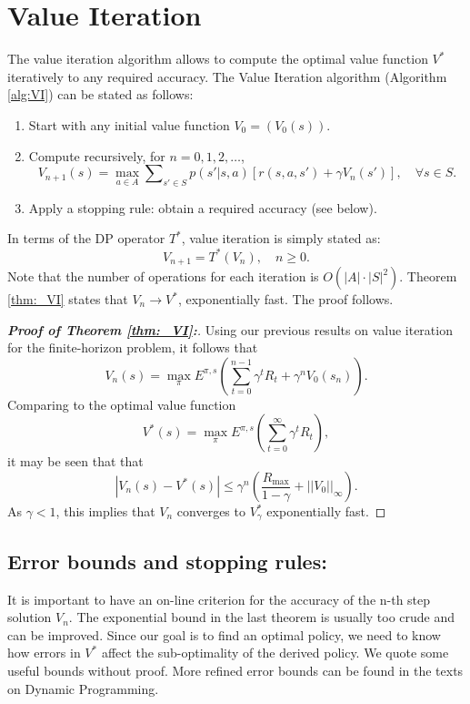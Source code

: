 \section{Value Iteration}

The value iteration algorithm allows to compute the optimal value function ${V^*}$ iteratively to any required accuracy.
The Value Iteration algorithm (Algorithm \ref{alg:VI}) can be stated as follows:
\begin{enumerate}
  \item Start with any initial value function ${V_0} = ({V_0}(s))$.
  \item Compute recursively, for $n = 0,1,2, \ldots $,
          \[{V_{n + 1}}(s) = \mathop {\max }\limits_{a \in A} \sum\nolimits_{s' \in S} {p(s'|s,a)[r(s,a,s') + \gamma {V_n}(s')]} ,       \quad \forall s \in S.\]
  \item Apply a stopping rule: obtain a required accuracy (see below).
\end{enumerate}
In terms of the DP operator $T_{}^*$, value iteration is simply stated as:
\[{V_{n + 1}} = T_{}^*({V_n}), \quad n \ge 0.\]
Note that the number of operations for each iteration is $O(|A| \cdot |S{|^2})$.
Theorem \ref{thm:_VI} states that ${V_n} \to V_{}^*$, exponentially fast. The proof follows.

\begin{proof}[\textbf{Proof of Theorem \ref{thm:_VI}:}]  Using our previous results on value iteration for the finite-horizon problem, it follows that
\[{V_n}(s) = \mathop {\max }\limits_\pi  {E^{\pi ,s}}(\sum\limits_{t = 0}^{n - 1} {{\gamma ^t}{R_t} + } {\gamma ^n}{V_0}({s_n})).\]
Comparing to the optimal value function
\[{V^*}(s) = \mathop {\max }\limits_\pi  {E^{\pi ,s}}(\sum\limits_{t = 0}^\infty  {{\gamma ^t}{R_t}} ),\]
it may be seen that that
                                \[|{V_n}(s) - V_{}^*(s)| \le {\gamma ^n}(\frac{{{R_{\max }}}}{{1 - \gamma }} + ||{V_0}|{|_\infty }).\]
As $\gamma  < 1$, this implies that ${V_n}$ converges to $V_\gamma ^*$  exponentially fast.                        \end{proof}


\subsection{Error bounds and stopping rules:}
It is important to have an on-line criterion for the accuracy of the n-th step solution ${V_n}$. The exponential bound in the last theorem is usually too crude and can be improved. Since our goal is to find an optimal policy, we need to know how errors in ${V^*}$ affect the sub-optimality of the derived policy. We quote some useful bounds without proof.  More refined error bounds can be found in the texts on Dynamic Programming.

